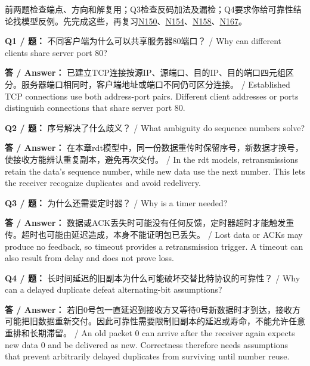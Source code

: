 

前两题检查端点、方向和解复用；Q3检查反码加法及漏检；Q4要求你给可靠性结论找模型反例。先完成这些，再复习\href{https://crazyshout.github.io/micro-course/cards.html\#CS5222-N150}{N150}、\href{https://crazyshout.github.io/micro-course/cards.html\#CS5222-N154}{N154}、\href{https://crazyshout.github.io/micro-course/cards.html\#CS5222-N158}{N158}、\href{https://crazyshout.github.io/micro-course/cards.html\#CS5222-N167}{N167}。


\textbf{Q1 / 题：} 不同客户端为什么可以共享服务器80端口？ / Why can different clients share server port 80?

\textbf{答 / Answer：} 已建立TCP连接按源IP、源端口、目的IP、目的端口四元组区分。服务器端口相同时，客户端地址或端口不同仍可区分连接。 / Established TCP connections use both address-port pairs. Different client addresses or ports distinguish connections that share server port 80.

\textbf{Q2 / 题：} 序号解决了什么歧义？ / What ambiguity do sequence numbers solve?

\textbf{答 / Answer：} 在本章rdt模型中，同一份数据重传时保留序号，新数据才换号，使接收方能辨认重复副本，避免再次交付。 / In the rdt models, retransmissions retain the data's sequence number, while new data use the next number. This lets the receiver recognize duplicates and avoid redelivery.

\textbf{Q3 / 题：} 为什么还需要定时器？ / Why is a timer needed?

\textbf{答 / Answer：} 数据或ACK丢失时可能没有任何反馈，定时器超时才能触发重传。超时也可能由延迟造成，本身不能证明包已丢失。 / Lost data or ACKs may produce no feedback, so timeout provides a retransmission trigger. A timeout can also result from delay and does not prove loss.

\textbf{Q4 / 题：} 长时间延迟的旧副本为什么可能破坏交替比特协议的可靠性？ / Why can a delayed duplicate defeat alternating-bit assumptions?

\textbf{答 / Answer：} 若旧0号包一直延迟到接收方又等待0号新数据时才到达，接收方可能把旧数据重新交付。因此可靠性需要限制旧副本的延迟或寿命，不能允许任意重排和长期滞留。 / An old packet 0 can arrive after the receiver again expects new data 0 and be delivered as new. Correctness therefore needs assumptions that prevent arbitrarily delayed duplicates from surviving until number reuse.

